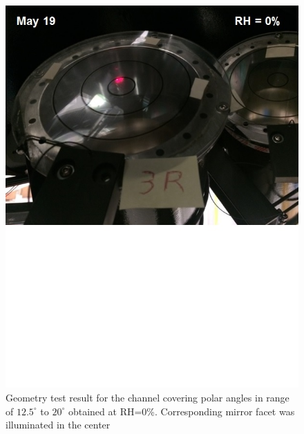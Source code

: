 \begin{figure}[ht]
    \centering
    \includegraphics[width=1.0\linewidth,trim={0 8.5cm 0 0},clip]{images/GEO_TEST_3_Zero.jpg}
    \caption{Geometry test result for the channel covering polar angles in range of $12.5^\circ$ to $20^\circ$ obtained at RH=0\%. Corresponding mirror facet was illuminated in the center}
    \label{fig:GEO_TEST_3_Zero}
\end{figure}
        
